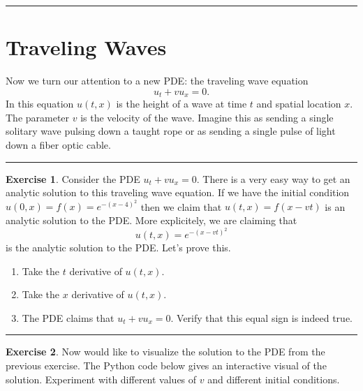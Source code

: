 \documentclass[
]{book}
\providecommand{\tightlist}{%
  \setlength{\itemsep}{0pt}\setlength{\parskip}{0pt}}
\theoremstyle{definition}
\theoremstyle{definition}
\theoremstyle{definition}
\newtheorem{exercise}{Exercise}[chapter]
\theoremstyle{remark}
\begin{document}
\begin{center}\rule{0.5\linewidth}{0.5pt}\end{center}

\hypertarget{traveling-waves}{%
\section{Traveling Waves}\label{traveling-waves}}

Now we turn our attention to a new PDE: the traveling wave equation
\[ u_t + v u_x = 0. \]
In this equation \(u(t,x)\) is the height of a wave at time \(t\) and spatial location \(x\). The parameter \(v\) is the velocity of the wave. Imagine this as sending a single solitary wave pulsing down a taught rope or as sending a single pulse of light down a fiber optic cable.

\begin{center}\rule{0.5\linewidth}{0.5pt}\end{center}

\begin{exercise}
\protect\hypertarget{exr:unnamed-chunk-584}{}{\label{exr:unnamed-chunk-584} }Consider the PDE \(u_t + v u_x = 0\). There is a very easy way to get an analytic solution to this traveling wave equation. If we have the initial condition \(u(0,x) = f(x) = e^{-(x-4)^2}\) then we claim that \(u(t,x) = f(x-vt)\) is an analytic solution to the PDE. More explicitely, we are claiming that
\[ u(t,x) = e^{-(x-vt)^2} \]
is the analytic solution to the PDE. Let's prove this.

\begin{enumerate}
\def\labelenumi{\alph{enumi}.}
\tightlist
\item
  Take the \(t\) derivative of \(u(t,x)\).
\item
  Take the \(x\) derivative of \(u(t,x)\).
\item
  The PDE claims that \(u_t + vu_x = 0\). Verify that this equal sign is indeed true.
\end{enumerate}
\end{exercise}

\begin{center}\rule{0.5\linewidth}{0.5pt}\end{center}

\begin{exercise}
\protect\hypertarget{exr:unnamed-chunk-585}{}{\label{exr:unnamed-chunk-585} }Now would like to visualize the solution to the PDE from the previous exercise. The Python code below gives an interactive visual of the solution. Experiment with different values of \(v\) and different initial conditions.
\end{exercise}
\end{document}
